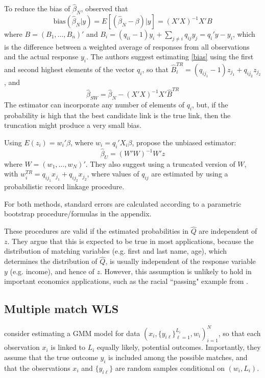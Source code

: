 \documentclass[12pt]{article}
\begin{document}
To reduce the bias of $\hat{\beta}_N$, \cite{sw1993} observed that 
\begin{equation} \text{bias} (\hat{\beta}_N | y) = E[(\hat{\beta}_N - \beta) | y ] = (X'X)^{-1} X'B \label{bias} \end{equation}
where $B = (B_1, \dots, B_n)'$ and $B_i = (q_{ii}-1)y_i + \sum_{j\neq i } q_{ij} y_j = q_i'y - y_i$, which is the difference between a weighted average of responses from all observations and the actual response $y_i$.  The authors suggest estimating \ref{bias} using the first and second highest elements of the vector $q_i$, so that $\hat{B}_i^{TR} = (q_{ij_1} - 1) z_{j_1} + q_{ij_2} z_{j_2}$, and 
\begin{equation} \hat{\beta}_{SW} = \hat{\beta}_N - (X'X)^{-1} X' \hat{B}^{TR} \label{sw}\end{equation}
The estimator can incorporate any number of elements of $q_i$, but, if the probability is high that the best candidate link is the true link, then the truncation might produce a very small bias. 

Using $E(z_i) = w_i'\beta$, where $w_i = q_i'X_i\beta$, \cite{lahiri05} propose the unbiased estimator:
$$ \hat{\beta}_U = (W'W)^{-1} W'z$$ 
where $W = (w_1, \dots, w_N)'$.  They also suggest using a truncated version of $W$, with $w_i^{TR} = q_{ij_1} x_{j_1} + q_{ij_2} x_{j_2}$, where values of $q_{ij}$ are estimated by using a probabilistic record linkage procedure.  

For both methods, standard errors are calculated according to a parametric bootstrap procedure/formulas in the appendix. 

These procedures are valid if the estimated probabilities in $\hat{Q}$ are independent of $z$.  They argue that this is expected to be true in most applications, because the distribution of matching variables (e.g. first and last name, age), which determines the distribution of $\hat{Q}$, is usually independent of the response variable $y$ (e.g. income), and hence of $z$.  However, this assumption is unlikely to hold in important economics applications, such as the racial ``passing" example from \cite{nq2015}. 

\subsection{Multiple match WLS}

 \cite{ahl2019} consider estimating a GMM model for data $(x_i, \{y_{i\ell}\}_{\ell=1}^{L_i}, w_i)_{i=1}^N$, so that each observation $x_i$ is linked to $L_i$ equally likely, potential outcomes.  Importantly, they assume that the true outcome $y_i$ is included among the possible matches, and that the observations $x_i$ and $\{y_{i\ell}\}$ are random samples conditional on $(w_i, L_i)$.  
 
\end{document}
